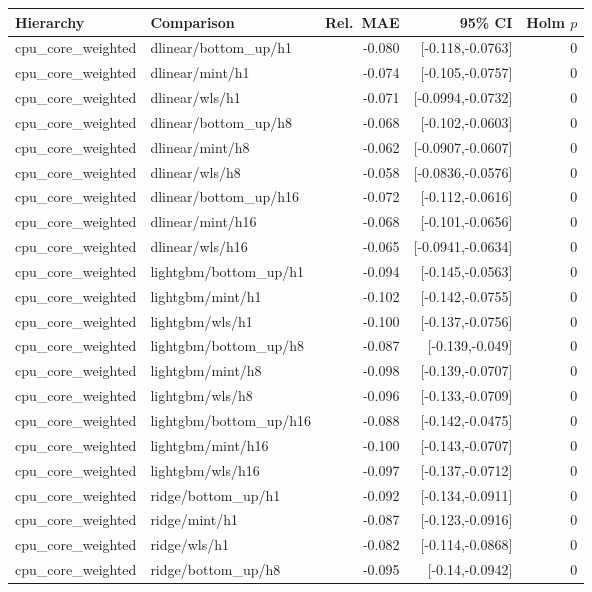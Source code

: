\begin{tabular}{llrrr}
Hierarchy & Comparison & Rel.\ MAE & 95\% CI & Holm $p$ \\
\hline
cpu_core_weighted & dlinear/bottom_up/h1 & -0.080 & [-0.118,-0.0763] & 0 \\
cpu_core_weighted & dlinear/mint/h1 & -0.074 & [-0.105,-0.0757] & 0 \\
cpu_core_weighted & dlinear/wls/h1 & -0.071 & [-0.0994,-0.0732] & 0 \\
cpu_core_weighted & dlinear/bottom_up/h8 & -0.068 & [-0.102,-0.0603] & 0 \\
cpu_core_weighted & dlinear/mint/h8 & -0.062 & [-0.0907,-0.0607] & 0 \\
cpu_core_weighted & dlinear/wls/h8 & -0.058 & [-0.0836,-0.0576] & 0 \\
cpu_core_weighted & dlinear/bottom_up/h16 & -0.072 & [-0.112,-0.0616] & 0 \\
cpu_core_weighted & dlinear/mint/h16 & -0.068 & [-0.101,-0.0656] & 0 \\
cpu_core_weighted & dlinear/wls/h16 & -0.065 & [-0.0941,-0.0634] & 0 \\
cpu_core_weighted & lightgbm/bottom_up/h1 & -0.094 & [-0.145,-0.0563] & 0 \\
cpu_core_weighted & lightgbm/mint/h1 & -0.102 & [-0.142,-0.0755] & 0 \\
cpu_core_weighted & lightgbm/wls/h1 & -0.100 & [-0.137,-0.0756] & 0 \\
cpu_core_weighted & lightgbm/bottom_up/h8 & -0.087 & [-0.139,-0.049] & 0 \\
cpu_core_weighted & lightgbm/mint/h8 & -0.098 & [-0.139,-0.0707] & 0 \\
cpu_core_weighted & lightgbm/wls/h8 & -0.096 & [-0.133,-0.0709] & 0 \\
cpu_core_weighted & lightgbm/bottom_up/h16 & -0.088 & [-0.142,-0.0475] & 0 \\
cpu_core_weighted & lightgbm/mint/h16 & -0.100 & [-0.143,-0.0707] & 0 \\
cpu_core_weighted & lightgbm/wls/h16 & -0.097 & [-0.137,-0.0712] & 0 \\
cpu_core_weighted & ridge/bottom_up/h1 & -0.092 & [-0.134,-0.0911] & 0 \\
cpu_core_weighted & ridge/mint/h1 & -0.087 & [-0.123,-0.0916] & 0 \\
cpu_core_weighted & ridge/wls/h1 & -0.082 & [-0.114,-0.0868] & 0 \\
cpu_core_weighted & ridge/bottom_up/h8 & -0.095 & [-0.14,-0.0942] & 0 \\

\end{tabular}
